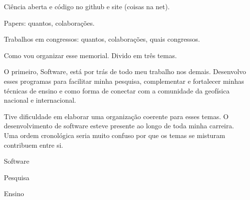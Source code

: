 Ciência aberta e código no github e site (coisas na net).

Papers: quantos, colaborações.

Trabalhos em congressos: quantos, colaborações, quais congressos.

Como vou organizar esse memorial.
Divido em três temas.

O primeiro, Software, está por trás de todo meu trabalho nos demais.
Desenvolvo esses programas para facilitar minha pesquisa, complementar e
fortalecer minhas técnicas de ensino e como forma de conectar com a comunidade
da geofísica nacional e internacional.

Tive dificuldade em elaborar uma organização coerente para esses temas.
O desenvolvimento de software esteve presente ao longo de toda minha carreira.
Uma ordem cronológica seria muito confuso por que os temas se misturam contribuem entre si.

Software

Pesquisa

Ensino

\citet{uieda2016a}

